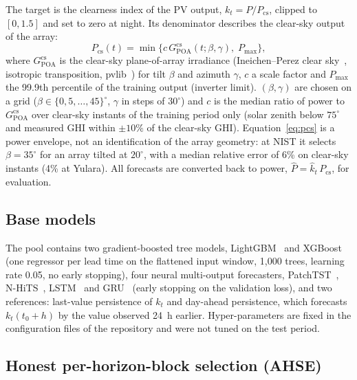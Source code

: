 The target is the clearness index of the PV output, $k_t = P / P_\mathrm{cs}$, clipped to
$[0, 1.5]$ and set to zero at night. Its denominator describes the clear-sky output of the array:
\begin{equation}
  P_\mathrm{cs}(t) = \min\bigl\{c\,G^\mathrm{cs}_\mathrm{POA}(t;\beta,\gamma),\; P_\mathrm{max}\bigr\},
  \label{eq:pcs}
\end{equation}
where $G^\mathrm{cs}_\mathrm{POA}$ is the clear-sky plane-of-array irradiance (Ineichen--Perez
clear sky~\cite{ineichen2002broadband}, isotropic transposition,
pvlib~\cite{holmgren2018pvlib}) for tilt $\beta$ and azimuth $\gamma$, $c$ a scale factor and
$P_\mathrm{max}$ the 99.9th percentile of the training output (inverter limit). $(\beta, \gamma)$
are chosen on a grid ($\beta \in \{0, 5, \dots, 45\}^\circ$, $\gamma$ in steps of $30^\circ$) and
$c$ is the median ratio of power to $G^\mathrm{cs}_\mathrm{POA}$ over clear-sky instants of the
training period only (solar zenith below $75^\circ$ and measured GHI within $\pm10\%$ of the
clear-sky GHI). Equation~\eqref{eq:pcs} is a power envelope, not an identification of the array
geometry: at NIST it selects $\beta = 35^\circ$ for an array tilted at $20^\circ$, with a median
relative error of 6\% on clear-sky instants (4\% at Yulara). All forecasts are converted back to
power, $\hat P = \hat k_t \, P_\mathrm{cs}$, for evaluation.

\subsection{Base models}
\label{subsec:base}

The pool contains two gradient-boosted tree models, LightGBM~\cite{ke2017lightgbm} and
XGBoost~\cite{chen2016xgboost} (one regressor per lead time on the flattened input window,
1{,}000 trees, learning rate 0.05, no early stopping), four neural multi-output forecasters,
PatchTST~\cite{nie2023patchtst}, N-HiTS~\cite{challu2023nhits}, LSTM~\cite{hochreiter1997lstm}
and GRU~\cite{cho2014gru} (early stopping on the validation loss), and two references: last-value
persistence of $k_t$ and day-ahead persistence, which forecasts $k_t(t_0 + h)$ by the value
observed 24~h earlier. Hyper-parameters are fixed in the configuration files of the repository
and were not tuned on the test period.

\subsection{Honest per-horizon-block selection (AHSE)}
\label{subsec:hbs}

